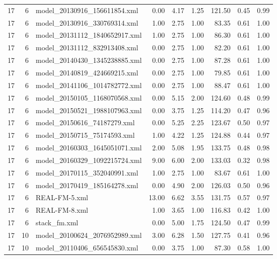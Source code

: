 \begin{table}[ht]
\begin{tabular}{rrlrrrrrr}
   17 &   6 & model\_20130916\_156611854.xml & 0.00 & 4.17 & 1.25 & 121.50 & 0.45 & 0.99 \\ 
   17 &   6 & model\_20130916\_330769314.xml & 1.00 & 2.75 & 1.00 & 83.35 & 0.61 & 1.00 \\ 
   17 &   6 & model\_20131112\_1840652917.xml & 1.00 & 2.75 & 1.00 & 86.30 & 0.61 & 1.00 \\ 
   17 &   6 & model\_20131112\_832913408.xml & 0.00 & 2.75 & 1.00 & 82.20 & 0.61 & 1.00 \\ 
   17 &   6 & model\_20140430\_1345238885.xml & 0.00 & 2.75 & 1.00 & 87.28 & 0.61 & 1.00 \\ 
   17 &   6 & model\_20140819\_424669215.xml & 0.00 & 2.75 & 1.00 & 79.85 & 0.61 & 1.00 \\ 
   17 &   6 & model\_20141106\_1014782772.xml & 0.00 & 2.75 & 1.00 & 88.47 & 0.61 & 1.00 \\ 
   17 &   6 & model\_20150105\_1168070568.xml & 0.00 & 5.15 & 2.00 & 124.60 & 0.48 & 0.99 \\ 
   17 &   6 & model\_20150521\_1988107963.xml & 0.00 & 3.75 & 1.25 & 114.20 & 0.47 & 0.96 \\ 
   17 &   6 & model\_20150616\_74187279.xml & 0.00 & 5.25 & 2.25 & 123.67 & 0.50 & 0.97 \\ 
   17 &   6 & model\_20150715\_75174593.xml & 1.00 & 4.22 & 1.25 & 124.88 & 0.44 & 0.97 \\ 
   17 &   6 & model\_20160303\_1645051071.xml & 2.00 & 5.08 & 1.95 & 133.75 & 0.48 & 0.98 \\ 
   17 &   6 & model\_20160329\_1092215724.xml & 9.00 & 6.00 & 2.00 & 133.03 & 0.32 & 0.98 \\ 
   17 &   6 & model\_20170115\_352040991.xml & 1.00 & 2.75 & 1.00 & 83.67 & 0.61 & 1.00 \\ 
   17 &   6 & model\_20170419\_185164278.xml & 0.00 & 4.90 & 2.00 & 126.03 & 0.50 & 0.96 \\ 
   17 &   6 & REAL-FM-5.xml & 13.00 & 6.62 & 3.55 & 131.75 & 0.57 & 0.97 \\ 
   17 &   6 & REAL-FM-8.xml & 1.00 & 3.65 & 1.00 & 116.83 & 0.42 & 1.00 \\ 
   17 &   6 & stack\_fm.xml & 0.00 & 5.00 & 1.75 & 124.50 & 0.47 & 0.99 \\ 
   17 &  10 & model\_20100624\_2076952989.xml & 3.00 & 6.28 & 1.50 & 127.75 & 0.41 & 0.96 \\ 
   17 &  10 & model\_20110406\_656545830.xml & 0.00 & 3.75 & 1.00 & 87.30 & 0.58 & 1.00 \\ 

\end{tabular}
\end{table}

